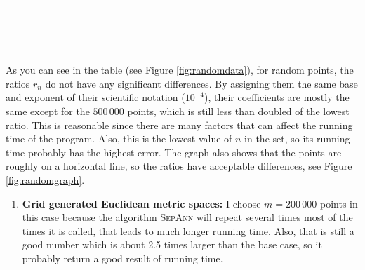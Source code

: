 \documentclass[12pt,english,]{article}
\providecommand{\tightlist}{%
  \setlength{\itemsep}{0pt}\setlength{\parskip}{0pt}}
\let\origfigure\figure
\let\endorigfigure\endfigure
\renewenvironment{figure}[1][2] {
    \expandafter\origfigure\expandafter[H]
} {
    \endorigfigure
}
\begin{document}
\begin{figure}
\begin{minipage}{0.95\textwidth}
\begin{center}
\end{center}
\end{minipage}
\caption[Caption]{The graph of ratios $r_n$ versus different values of $n$ of random points with $n \in \{500\,000, 1\,000\,000, 2\,000\,000, 4\,000\,000, 8\,000\,000\}$ (with y-scale = $0.5\times10^{-4}$).}
\label{fig:randomgraph}
\end{figure}
\hrule

~

~

As you can see in the table (see Figure \ref{fig:randomdata}), for
random points, the ratios \(r_n\) do not have any significant
differences. By assigning them the same base and exponent of their
scientific notation (\(10^{-4}\)), their coefficients are mostly the
same except for the \(500\,000\) points, which is still less than
doubled of the lowest ratio. This is reasonable since there are many
factors that can affect the running time of the program. Also, this is
the lowest value of \(n\) in the set, so its running time probably has
the highest error. The graph also shows that the points are roughly on a
horizontal line, so the ratios have acceptable differences, see Figure
\ref{fig:randomgraph}.

\begin{enumerate}
\def\labelenumi{\arabic{enumi}.}
\setcounter{enumi}{1}
\tightlist
\item
  \textbf{Grid generated Euclidean metric spaces:} I choose
  \(m = 200\,000\) points in this case because the algorithm
  \textsc{SepAnn} will repeat several times most of the times it is
  called, that leads to much longer running time. Also, that is still a
  good number which is about 2.5 times larger than the base case, so it
  probably return a good result of running time.
\end{enumerate}
\end{document}
